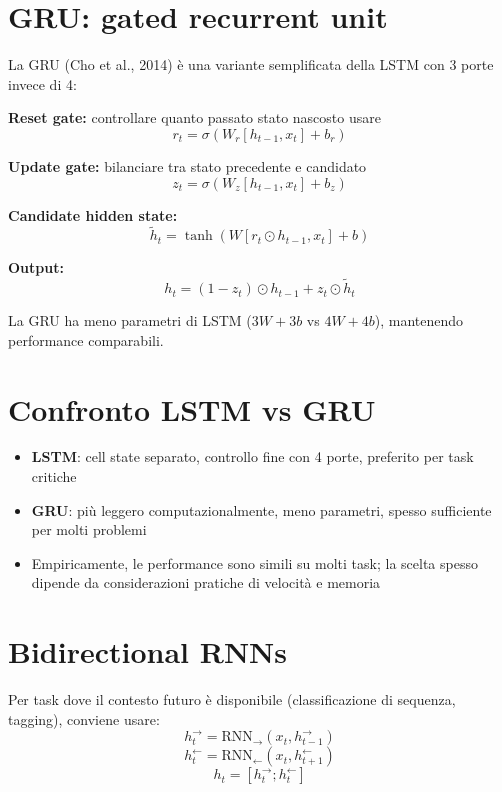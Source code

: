 \section{GRU: gated recurrent unit}

\begin{definition}[GRU]
La GRU (Cho et al., 2014) è una variante semplificata della LSTM con 3 porte invece di 4:

\textbf{Reset gate:} controllare quanto passato stato nascosto usare
\[
r_t = \sigma(W_r [h_{t-1}, x_t] + b_r)
\]

\textbf{Update gate:} bilanciare tra stato precedente e candidato
\[
z_t = \sigma(W_z [h_{t-1}, x_t] + b_z)
\]

\textbf{Candidate hidden state:}
\[
\tilde{h}_t = \tanh(W [r_t \odot h_{t-1}, x_t] + b)
\]

\textbf{Output:}
\[
h_t = (1 - z_t) \odot h_{t-1} + z_t \odot \tilde{h}_t
\]

La GRU ha meno parametri di LSTM ($3W + 3b$ vs $4W + 4b$), mantenendo performance comparabili.
\end{definition}

\section{Confronto LSTM vs GRU}

\begin{itemize}
\item \textbf{LSTM}: cell state separato, controllo fine con 4 porte, preferito per task critiche
\item \textbf{GRU}: più leggero computazionalmente, meno parametri, spesso sufficiente per molti problemi
\item Empiricamente, le performance sono simili su molti task; la scelta spesso dipende da considerazioni pratiche di velocità e memoria
\end{itemize}

\section{Bidirectional RNNs}

Per task dove il contesto futuro è disponibile (classificazione di sequenza, tagging), conviene usare:
\[
h_t^{\rightarrow} = \text{RNN}_{\rightarrow}(x_t, h_{t-1}^{\rightarrow})
\]
\[
h_t^{\leftarrow} = \text{RNN}_{\leftarrow}(x_t, h_{t+1}^{\leftarrow})
\]
\[
h_t = [h_t^{\rightarrow}; h_t^{\leftarrow}]
\]

